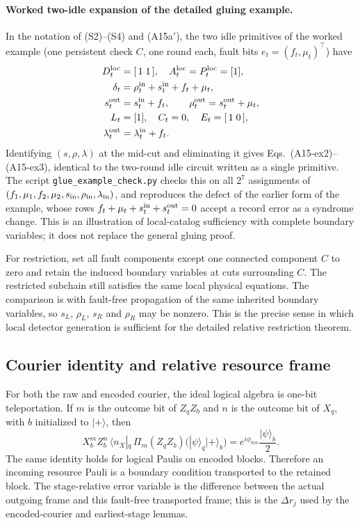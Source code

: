 \documentclass[aps,prx,reprint,superscriptaddress,nofootinbib,floatfix,longbibliography]{revtex4-2}
\theoremstyle{definition}
\begin{document}
\paragraph{Worked two-idle expansion of the detailed gluing example.}
\label{ex:gluing-supp}
In the notation of (S2)--(S4) and (A15a$'$), the two idle primitives of the
worked example (one persistent check $C$, one round each, fault bits
$e_t=(f_t,\mu_t)^\top$) have
\begin{align*}
 D_t^{\mathrm{loc}}&=[\,1\;1\,],\quad A_t^{\mathrm{loc}}=P_t^{\mathrm{loc}}=[1],\\
 \delta_t&=\rho^{\rm in}_t+s^{\rm in}_t+f_t+\mu_t,\\
 s^{\rm out}_t&=s^{\rm in}_t+f_t,\qquad \rho^{\rm out}_t=s^{\rm out}_t+\mu_t,\\
 L_t&=[1],\quad C_t=0,\quad E_t=[\,1\;0\,],\\
 \lambda^{\rm out}_t&=\lambda^{\rm in}_t+f_t .
\end{align*}
Identifying $(s,\rho,\lambda)$ at the mid-cut and eliminating it gives
Eqs.~(A15-ex2)--(A15-ex3), identical to the two-round idle circuit written
as a single primitive.  The script \texttt{glue\_example\_check.py} checks
this on all $2^7$ assignments of
$(f_1,\mu_1,f_2,\mu_2,s_{\rm in},\rho_{\rm in},\lambda_{\rm in})$, and reproduces
the defect of the earlier form of the example, whose rows
$f_t+\mu_t+s^{\rm in}_t+s^{\rm out}_t=0$ accept a record error as a syndrome
change.  This is an illustration of local-catalog sufficiency with complete
boundary variables; it does not replace the general gluing proof.

For restriction, set all fault components except one connected component $C$
to zero and retain the induced boundary variables at cuts surrounding $C$.  The
restricted subchain still satisfies the same local physical equations.  The
comparison is with fault-free propagation of the same inherited boundary
variables, so $s_L$, $\rho_L$, $s_R$ and $\rho_R$ may be nonzero.  This is the
precise sense in which local detector generation is sufficient for the
detailed relative restriction theorem.

\subsection{Courier identity and relative resource frame}
For both the raw and encoded courier, the ideal logical algebra is one-bit
teleportation.  If $m$ is the outcome bit of $Z_qZ_b$ and $n$ is the outcome
bit of $X_q$, with $b$ initialized to $|+\rangle$, then
\begin{equation}
 X_b^m Z_b^n\,\langle n_X|_q\,\Pi_m(Z_qZ_b)
 \bigl(|\psi\rangle_q|+\rangle_b\bigr)
 = e^{i\phi_{mn}}\frac{|\psi\rangle_b}{2}.
 \tag{S6}
\end{equation}
The same identity holds for logical Paulis on encoded blocks.  Therefore an
incoming resource Pauli is a boundary condition transported to the retained
block.  The stage-relative error variable is the difference between the
actual outgoing frame and this fault-free transported frame; this is the
$\Delta r_j$ used by the encoded-courier and earliest-stage lemmas.
\end{document}
